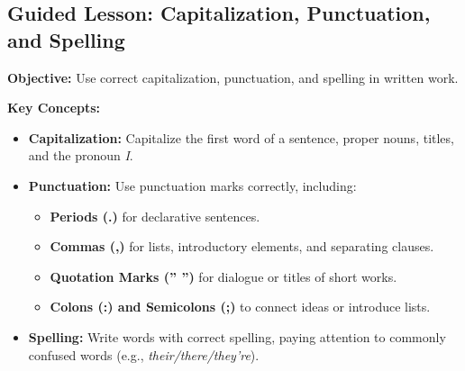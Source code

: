 \documentclass[12pt]{article}
\title{}
\date{}
\begin{document}
\subsection*{Guided Lesson: Capitalization, Punctuation, and Spelling}
\onehalfspacing

\begin{tcolorbox}[colframe=black!40, colback=gray!5, 
coltitle=black, colbacktitle=black!20, fonttitle=\bfseries\Large, 
title=Learning Objective, halign title=center, left=5pt, right=5pt, top=5pt, bottom=15pt]
\textbf{Objective:} Use correct capitalization, punctuation, and spelling in written work.
\end{tcolorbox}

\vspace{1em}

\begin{tcolorbox}[colframe=black!60, colback=white, 
coltitle=black, colbacktitle=black!15, fonttitle=\bfseries\Large, 
title=Key Concepts and Vocabulary, halign title=center, left=10pt, right=10pt, top=10pt, bottom=15pt]
\textbf{Key Concepts:}
\begin{itemize}
    \item \textbf{Capitalization:} Capitalize the first word of a sentence, proper nouns, titles, and the pronoun \textit{I}.
    \item \textbf{Punctuation:} Use punctuation marks correctly, including:
    \begin{itemize}
        \item \textbf{Periods (.)} for declarative sentences.
        \item \textbf{Commas (,)} for lists, introductory elements, and separating clauses.
        \item \textbf{Quotation Marks (” ”)} for dialogue or titles of short works.
        \item \textbf{Colons (:) and Semicolons (;)} to connect ideas or introduce lists.
    \end{itemize}
    \item \textbf{Spelling:} Write words with correct spelling, paying attention to commonly confused words (e.g., \textit{their/there/they're}).
\end{itemize}
\end{tcolorbox}

\vspace{1em}
\end{document}
